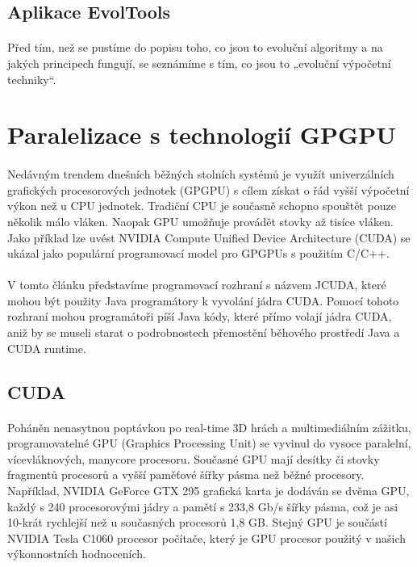 \documentclass[bc,male,java,dept460]{diploma}		%
\begin{document}
\subsection{Aplikace EvolTools}
\paragraph*{}
Před tím, než se pustíme do popisu toho, co jsou to evoluční algoritmy a na jakých principech fungují, se seznámíme s tím, co jsou to „evoluční výpočetní techniky“.

\section{Paralelizace s technologií GPGPU}
\paragraph*{}
Nedávným trendem dnešních běžných stolních systémů je využít univerzálních grafických procesorových jednotek (GPGPU) s cílem získat o řád vyšší výpočetní výkon než u CPU jednotek. Tradiční CPU je současně schopno spouštět pouze několik málo vláken. Naopak GPU umožňuje provádět stovky až tisíce vláken.
Jako příklad lze uvést NVIDIA Compute Unified Device Architecture (CUDA) se ukázal jako populární programovací model pro GPGPUs s použitím C/C++.

\paragraph*{}
V tomto článku představíme programovací rozhraní s názvem JCUDA, které mohou být použity Java programátory k vyvolání jádra CUDA. Pomocí tohoto rozhraní mohou programátoři píší Java kódy, které přímo volají jádra CUDA, aniž by se museli starat o podrobnostech přemostění běhového prostředí Java a CUDA runtime.

\subsection{CUDA}
\paragraph*{}
Poháněn nenasytnou poptávkou po real-time 3D hrách a multimediálním zážitku, programovatelné GPU (Graphics Processing Unit) se vyvinul do vysoce paralelní, vícevláknových, manycore procesoru. Současné GPU mají desítky či stovky fragmentů procesorů a vyšší paměťové šířky pásma než běžné procesory. Například, NVIDIA GeForce GTX 295 grafická karta je dodáván se dvěma GPU, každý s 240 procesorovými jádry a pamětí s 233,8 Gb/s šířky pásma, což je asi 10-krát rychlejší než u současných procesorů 1,8 GB. Stejný GPU je součástí NVIDIA Tesla C1060 procesor počítače, který je GPU procesor použitý v našich výkonnostních hodnoceních.
\end{document}
